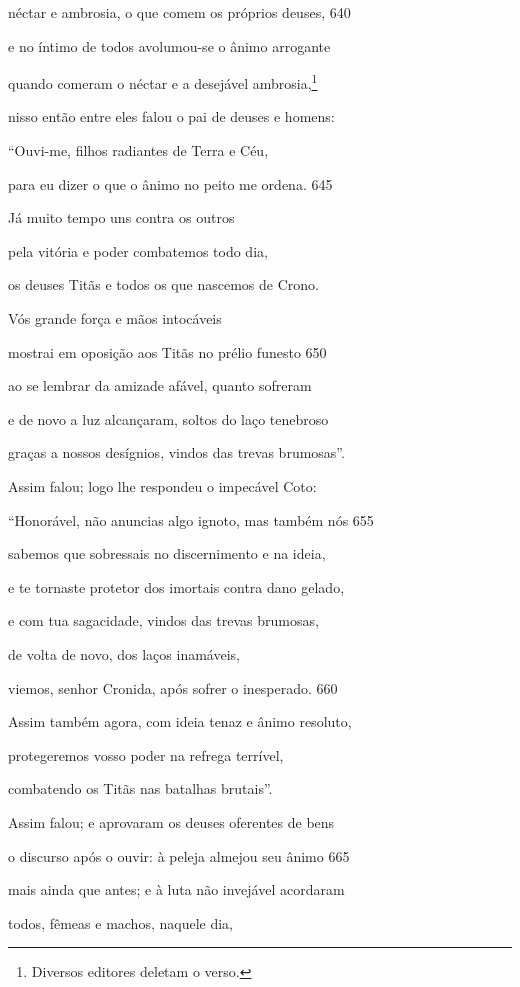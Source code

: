 néctar e ambrosia, o que comem os próprios deuses, \num{640}

e no íntimo de todos avolumou-se o ânimo arrogante

quando comeram o néctar e a desejável ambrosia,\footnote{Diversos editores deletam o verso.}

nisso então entre eles falou o pai de deuses e homens:

``Ouvi-me, filhos radiantes de Terra e Céu,

para eu dizer o que o ânimo no peito me ordena. \num{645}

Já muito tempo uns contra os outros

pela vitória e poder combatemos todo dia,

os deuses Titãs e todos os que nascemos de Crono.

Vós grande força e mãos intocáveis

mostrai em oposição aos Titãs no prélio funesto \num{650}

ao se lembrar da amizade afável, quanto sofreram

e de novo a luz alcançaram, soltos do laço tenebroso

graças a nossos desígnios, vindos das trevas brumosas''.

\quad{}Assim falou; logo lhe respondeu o impecável Coto:

``Honorável, não anuncias algo ignoto, mas também nós \num{655}

sabemos que sobressais no discernimento e na ideia,

e te tornaste protetor dos imortais contra dano gelado,

e com tua sagacidade, vindos das trevas brumosas,

de volta de novo, dos laços inamáveis,

viemos, senhor Cronida, após sofrer o inesperado. \num{660}

Assim também agora, com ideia tenaz e ânimo resoluto,

protegeremos vosso poder na refrega terrível,

combatendo os Titãs nas batalhas brutais''.

Assim falou; e aprovaram os deuses oferentes de bens

o discurso após o ouvir: à peleja almejou seu ânimo \num{665}

mais ainda que antes; e à luta não invejável acordaram

todos, fêmeas e machos, naquele dia,

